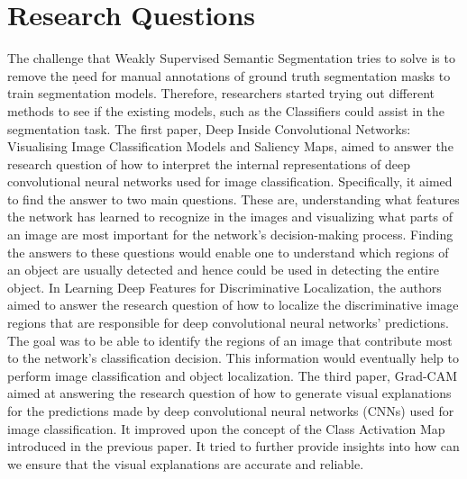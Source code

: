 \documentclass[11pt]{article}
\begin{document}
\section{Research Questions}
The challenge that Weakly Supervised Semantic Segmentation tries to solve is to remove the ṇeed for manual annotations of ground truth segmentation masks to train segmentation models. Therefore, researchers started trying out different methods to see if the existing models, such as the Classifiers could assist in the segmentation task. \newline 
 The first paper, Deep Inside Convolutional Networks: Visualising Image Classification Models and Saliency Maps, aimed to answer the research question of how to interpret the internal representations of deep convolutional neural networks used for image classification. Specifically, it aimed to find the answer to two main questions. These are, understanding what features the network has learned to recognize in the images and visualizing what parts of an image are most important for the network's decision-making process. Finding the answers to these questions would enable one to understand which regions of an object are usually detected and hence could be used in detecting the entire object. \newline
 In Learning Deep Features for Discriminative Localization, the authors aimed to answer the research question of how to localize the discriminative image regions that are responsible for deep convolutional neural networks' predictions. The goal was to be able to identify the regions of an image that contribute most to the network's classification decision. This information would eventually help to perform image classification and object localization. \newline
 The third paper, Grad-CAM aimed at answering the research question of how to generate visual explanations for the predictions made by deep convolutional neural networks (CNNs) used for image classification. It improved upon the concept of the Class Activation Map introduced in the previous paper. It tried to further provide insights into how can we ensure that the visual explanations are accurate and reliable. 
\end{document}
